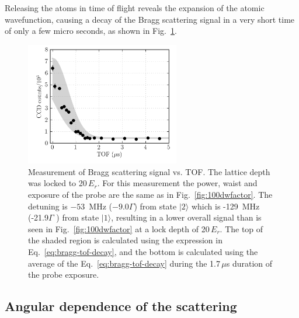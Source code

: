 Releasing the atoms in time of flight reveals the expansion of the atomic
wavefunction, causing a decay of the Bragg scattering signal in a very short
time of only a few micro seconds, as shown in Fig.~\ref{fig:100tof}. 
\begin{figure}
    \centering
\includegraphics[width=0.6\textwidth]{../figures/braggscatt/tofNice2.png}
\caption{\small  Measurement of Bragg scattering signal vs. TOF.  The lattice
depth was locked to 20\,$E_{r}$.  For this measurement the power, waist and
exposure of the probe are the same as in Fig.~\ref{fig:100dwfactor}.  The
detuning is $-53$~MHz ($-9.0\Gamma$) from state $|2\rangle$ which is -129~MHz
(-21.9$\Gamma$ ) from state $|1\rangle$, resulting in a lower overall signal
than is seen in Fig.~\ref{fig:100dwfactor} at a lock depth of 20\,$E_{r}$.  The
top of the shaded region is calculated using the expression in
Eq.~\ref{eq:bragg-tof-decay}, and the bottom is calculated using the average of
the Eq.~\ref{eq:bragg-tof-decay} during the 1.7\,$\mu$s duration of the probe
exposure.  }
\label{fig:100tof}
\end{figure}


\subsection{Angular dependence of the scattering} 

